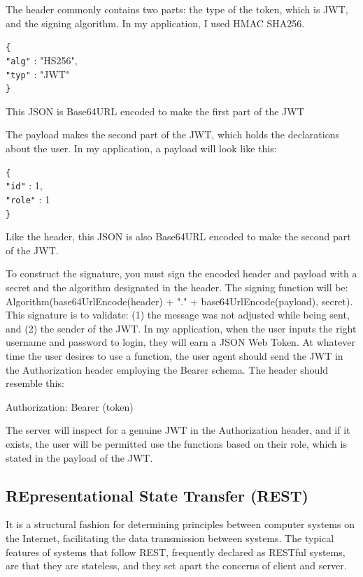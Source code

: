 \documentclass[a4paper, 11pt,openany]{book} %
\begin{document}
The header commonly contains two parts: the type of the token, which is JWT, and the signing algorithm. In my application, I used HMAC SHA256.
\begin{tabbing}
\verb|{| \\
\quad \verb|"alg"| : "HS256", \\
\quad  \verb|"typ"| : "JWT" \\
\verb|}|
\end{tabbing}
This JSON is Base64URL encoded to make the first part of the JWT\par
The payload makes the second part of the JWT, which holds the declarations about the user.
In my application, a payload will look like this:
\begin{tabbing}
\verb|{| \\
\quad \verb|"id"| : 1, \\
\quad  \verb|"role"| : 1 \\
\verb|}|
\end{tabbing}
Like the header, this JSON is also Base64URL encoded to make the second part of the JWT.\par
To construct the signature, you must sign the encoded header and payload with a secret and the algorithm designated in the header. The signing function will be: Algorithm(base64UrlEncode(header) + "." + base64UrlEncode(payload), secret). This signature is to validate: (1) the message was not adjusted while being sent, and (2) the sender of the JWT.
In my application, when the user inputs the right username and password to login, they will earn a JSON Web Token. At whatever time the user desires to use a function, the user agent should send the JWT in the Authorization header employing the Bearer schema. The header should resemble this:\par
Authorization: Bearer (token)\par
The server will inspect for a genuine JWT in the Authorization header, and if it exists, the user will be permitted use the functions based on their role, which is stated in the payload of the JWT.\cite{jwt}
\subsection{REpresentational State Transfer (REST)}
It is a structural fashion for determining principles between computer systems on the Internet, facilitating the data transmission between systems. The typical features of systems that follow REST, frequently declared as RESTful systems, are that they are stateless, and they set apart the concerns of client and server.
\end{document}
